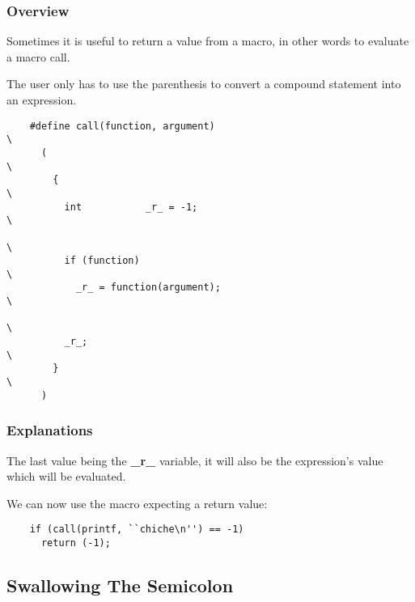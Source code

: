 \documentclass[9pt]{beamer}
\newcommand{\nl}[0]{\vspace{0.4cm}}
\begin{document}
\begin{frame}[containsverbatim]
  \frametitle{Overview}

  Sometimes it is useful to return a value from a macro, in other words
  to evaluate a macro call.

  \nl

  The user only has to use the parenthesis to convert a compound statement
  into an expression.

  \begin{verbatim}
    #define call(function, argument)                                    \
      (                                                                 \
        {                                                               \
          int           _r_ = -1;                                       \
                                                                        \
          if (function)                                                 \
            _r_ = function(argument);                                   \
                                                                        \
          _r_;                                                          \
        }                                                               \
      )
  \end{verbatim}
\end{frame}


\begin{frame}[containsverbatim]
  \frametitle{Explanations}

  The last value being the \textbf{\_r\_} variable, it will also be
  the expression's value which will be evaluated.

  \nl

  We can now use the macro expecting a return value:

  \begin{verbatim}
    if (call(printf, ``chiche\n'') == -1)
      return (-1);
  \end{verbatim}
\end{frame}

%
%

\subsection{Swallowing The Semicolon}

\end{document}

